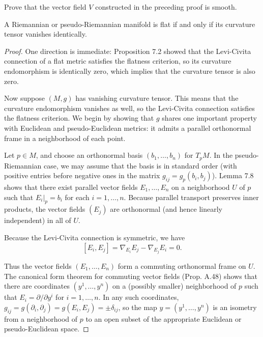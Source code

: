 \begin{exercise}
\label{exer:constructed-vector-field-smooth}
Prove that the vector field $V$ constructed in the preceding proof is smooth.
\end{exercise}

\begin{theorem}
\label{thm:flatness-iff-zero-curvature}
A Riemannian or pseudo-Riemannian manifold is flat if and only if its curvature tensor vanishes identically.
\end{theorem}

\begin{proof}
One direction is immediate: Proposition 7.2 showed that the Levi-Civita connection of a flat metric satisfies the flatness criterion, so its curvature endomorphism is identically zero, which implies that the curvature tensor is also zero.

Now suppose $(M, g)$ has vanishing curvature tensor. This means that the curvature endomorphism vanishes as well, so the Levi-Civita connection satisfies the flatness criterion. We begin by showing that $g$ shares one important property with Euclidean and pseudo-Euclidean metrics: it admits a parallel orthonormal frame in a neighborhood of each point.

Let $p \in M$, and choose an orthonormal basis $(b_1, \ldots, b_n)$ for $T_p M$. In the pseudo-Riemannian case, we may assume that the basis is in standard order (with positive entries before negative ones in the matrix $g_{ij} = g_p(b_i, b_j)$). Lemma 7.8 shows that there exist parallel vector fields $E_1, \ldots, E_n$ on a neighborhood $U$ of $p$ such that $E_i|_p = b_i$ for each $i = 1, \ldots, n$. Because parallel transport preserves inner products, the vector fields $(E_j)$ are orthonormal (and hence linearly independent) in all of $U$.

Because the Levi-Civita connection is symmetric, we have
\[
[E_i, E_j] = \nabla_{E_i} E_j - \nabla_{E_j} E_i = 0.
\]

Thus the vector fields $(E_1, \ldots, E_n)$ form a commuting orthonormal frame on $U$. The canonical form theorem for commuting vector fields (Prop. A.48) shows that there are coordinates $(y^1, \ldots, y^n)$ on a (possibly smaller) neighborhood of $p$ such that $E_i = \partial/\partial y^i$ for $i = 1, \ldots, n$. In any such coordinates, $g_{ij} = g(\partial_i, \partial_j) = g(E_i, E_j) = \pm\delta_{ij}$, so the map $y = (y^1, \ldots, y^n)$ is an isometry from a neighborhood of $p$ to an open subset of the appropriate Euclidean or pseudo-Euclidean space.
\end{proof}

